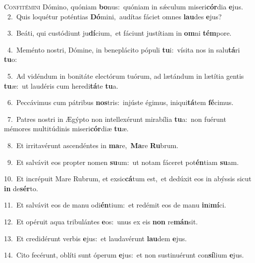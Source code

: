 \lettrine{\initial\textcolor{\initialcolor}{C}}{onfitémini} Dómino, quóniam \textbf{bo}\-nus:~\star quóniam in sǽculum miseri\-\textbf{cór}\-dia \textbf{e}\-jus.\\
{\numbfont\textcolor{\numbcolor}{~2.}}~Quis loquétur poténtias \textbf{Dó}\-mini,~\star audítas fáciet omnes \textbf{lau}\-des \textbf{e}\-jus?\par
{\numbfont\textcolor{\numbcolor}{~3.}}~Beáti, qui custódiunt ju\-\textbf{dí}\-cium,~\star et fáciunt justítiam in \textbf{om}\-ni \textbf{tém}\-pore.\par
{\numbfont\textcolor{\numbcolor}{~4.}}~Meménto nostri, Dómine, in beneplácito pópuli \textbf{tu}\-i:~\star vísita nos in salu\-\textbf{tá}\-ri \textbf{tu}\-o:\par
{\numbfont\textcolor{\numbcolor}{~5.}}~Ad vidéndum in bonitáte electórum tuórum, ad lætándum in lætítia gentis \textbf{tu}\-æ:~\star ut laudéris cum heredi\-\textbf{tá}\-te \textbf{tu}\-a.\par
{\numbfont\textcolor{\numbcolor}{~6.}}~Peccávimus cum pátribus \textbf{nos}\-tris:~\star injúste égimus, iniqui\-\textbf{tá}\-tem \textbf{fé}\-cimus.\par
{\numbfont\textcolor{\numbcolor}{~7.}}~Patres nostri in Ægýpto non intellexérunt mirabília \textbf{tu}\-a:~\star non fuérunt mémores multitúdinis miseri\-\textbf{cór}\-diæ \textbf{tu}\-æ.\par
{\numbfont\textcolor{\numbcolor}{~8.}}~Et irritavérunt ascendéntes in \textbf{ma}\-re,~\star \textbf{Ma}\-re \textbf{Ru}\-brum.\par
{\numbfont\textcolor{\numbcolor}{~9.}}~Et salvávit eos propter nomen \textbf{su}\-um:~\star ut notam fáceret pot\-\textbf{én}\-tiam \textbf{su}\-am.\par
{\numbfont\textcolor{\numbcolor}{10.}}~Et incrépuit Mare Rubrum, et exsic\-\textbf{cá}\-tum est,~\star et dedúxit eos in abýssis sicut \textbf{in} de\-\textbf{sér}\-to.\par
{\numbfont\textcolor{\numbcolor}{11.}}~Et salvávit eos de manu odi\-\textbf{én}\-tium:~\star et redémit eos de manu \textbf{in}\-i\-\textbf{mí}\-ci.\par
{\numbfont\textcolor{\numbcolor}{12.}}~Et opéruit aqua tribulántes \textbf{e}\-os:~\star unus ex eis \textbf{non} re\-\textbf{mán}\-sit.\par
{\numbfont\textcolor{\numbcolor}{13.}}~Et credidérunt verbis \textbf{e}\-jus:~\star et laudavérunt \textbf{lau}\-dem \textbf{e}\-jus.\par
{\numbfont\textcolor{\numbcolor}{14.}}~Cito fecérunt, oblíti sunt óperum \textbf{e}\-jus:~\star et non sustinuérunt con\-\textbf{sí}\-lium \textbf{e}\-jus.\par
